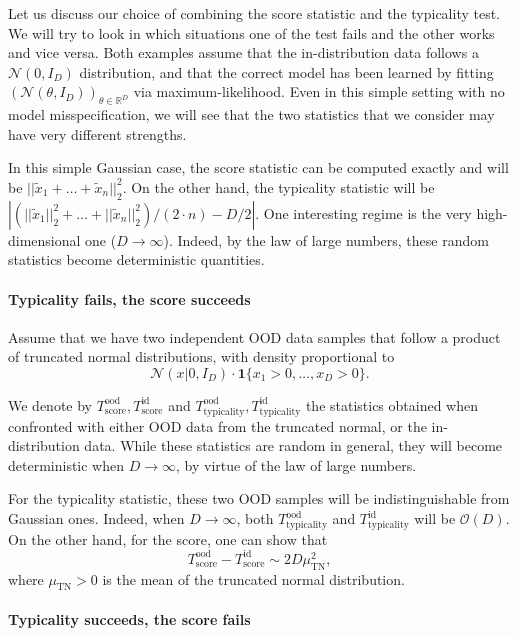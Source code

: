 {Let us discuss our choice of combining the score statistic and the typicality test. We will try to look in which situations one of the test fails and the other works and vice versa. Both examples assume that the in-distribution data follows a $\mathcal{N}(0,I_D)$ distribution, and that the correct model has been learned by fitting $(\mathcal{N}(\theta,I_D))_{\theta \in \mathbb{R}^D}$ via maximum-likelihood. Even in this simple setting with no model misspecification, we will see that the two statistics that we consider may have very different strengths.

In this simple Gaussian case, the score statistic can be computed exactly and will be $||\tilde{x}_1 + \ldots + \tilde{x}_n ||_2^2 $. On the other hand, the typicality statistic will be $| (||\tilde{x}_1||_2^2 + \ldots + ||\tilde{x}_n||_2^2)/(2\cdot n) -  D/ 2| $. One interesting regime is the very high-dimensional one ($D \to \infty$). Indeed, by the law of large numbers, these random statistics become deterministic quantities.


\paragraph{Typicality fails, the score succeeds}

Assume that we have two independent OOD data samples that follow a product of truncated normal distributions, with density proportional to $$\mathcal{N}(x | 0,I_D) \cdot  \mathbf{1}\{x_1>0,\ldots,x_D>0\}.$$

We denote by $T_\text{score}^\text{ood},T_\text{score}^\text{id}$ and $T_\text{typicality}^\text{ood},T_\text{typicality}^\text{id}$ the statistics obtained when confronted with either OOD data from the truncated normal, or the in-distribution data. While these statistics are random in general, they will become deterministic when $D \to \infty$, by virtue of the law of large numbers.

For the typicality statistic, these two OOD samples will be indistinguishable from Gaussian ones. Indeed, when $D \to \infty$, both $T_\text{typicality}^\text{ood}$ and $T_\text{typicality}^\text{id}$ will be $\mathcal{O}(D)$.
%
On the other hand, for the score, one can show that
\begin{equation}
T_\text{score}^\text{ood} - T_\text{score}^\text{id} \sim 2 D \mu_\text{TN}^2,
\end{equation}
where $\mu_\text{TN}>0$ is the mean of the truncated normal distribution.


\paragraph{Typicality succeeds, the score fails}

}

